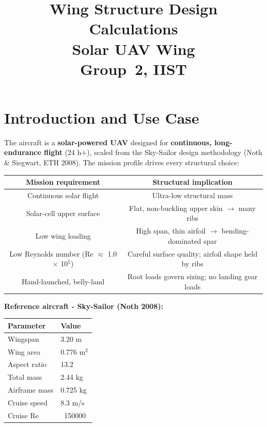 \documentclass[10pt,a4paper]{article}
\title{\textbf{Wing Structure Design Calculations}\\[0.5em]
\Large Solar UAV Wing \\[10pt]
Group~2, IIST}
\author{}
\date{}
\begin{document}
\maketitle
\tableofcontents
\newpage

\newpage \section{Introduction and Use Case}

The aircraft is a \textbf{solar-powered UAV} designed for \textbf{continuous, long-endurance flight} (24 h+), scaled from the Sky-Sailor design methodology (Noth \& Siegwart, ETH 2008). The mission profile drives every structural choice:

\begin{center}
\begin{tabular}{|c|c|}
\hline
\textbf{Mission requirement} & \textbf{Structural implication} \\
\hline
Continuous solar flight & Ultra-low structural mass \\
\hline
Solar-cell upper surface & Flat, non-buckling upper skin ${\rightarrow}$ many ribs \\
\hline
Low wing loading & High span, thin airfoil ${\rightarrow}$ bending-dominated spar \\
\hline
Low Reynolds number (Re ${\approx}$ 1.0 ${\times}$ 10$^{5}$) & Careful surface quality; airfoil shape held by ribs \\
\hline
Hand-launched, belly-land & Root loads govern sizing; no landing gear loads \\
\hline
\end{tabular}
\end{center}

\textbf{Reference aircraft - Sky-Sailor (Noth 2008):}

\begin{center}
\begin{tabular}{|l|l|}
\hline
Parameter & Value \\
\hline
Wingspan & 3.20 m \\
\hline
Wing area & 0.776 m$^{2}$ \\
\hline
Aspect ratio & 13.2 \\
\hline
Total mass & 2.44 kg \\
\hline
Airframe mass & 0.725 kg \\
\hline
Cruise speed & 8.3 m/s \\
\hline
Cruise Re & ~150000 \\
\hline
\end{tabular}
\end{center}
\end{document}
